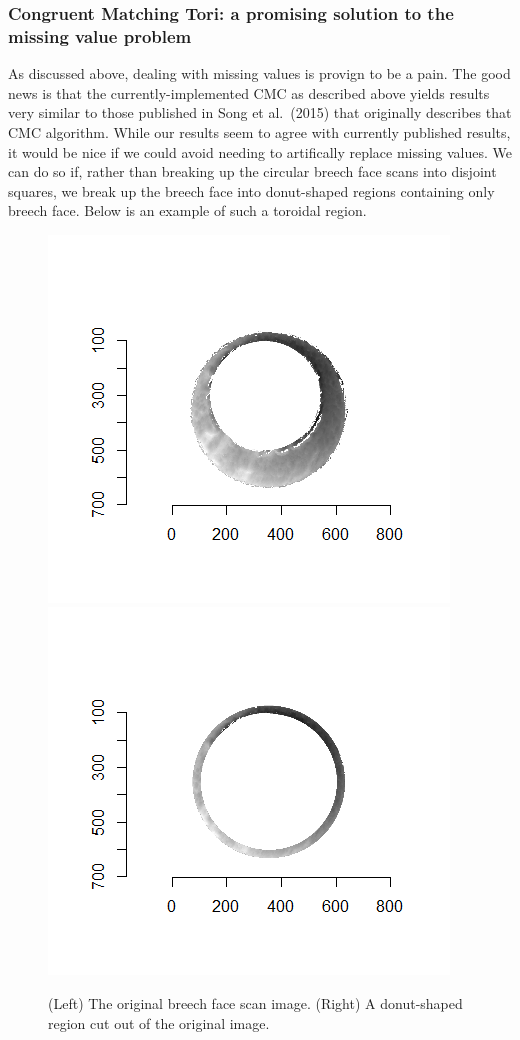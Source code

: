 \documentclass[]{book}
\begin{document}
\hypertarget{congruent-matching-tori-a-promising-solution-to-the-missing-value-problem}{%
\subsubsection{Congruent Matching Tori: a promising solution to the missing value problem}\label{congruent-matching-tori-a-promising-solution-to-the-missing-value-problem}}

As discussed above, dealing with missing values is provign to be a pain. The good news is that the currently-implemented CMC as described above yields results very similar to those published in Song et al.~(2015) that originally describes that CMC algorithm. While our results seem to agree with currently published results, it would be nice if we could avoid needing to artifically replace missing values. We can do so if, rather than breaking up the circular breech face scans into disjoint squares, we break up the breech face into donut-shaped regions containing only breech face. Below is an example of such a toroidal region.

\begin{figure}

{\centering \includegraphics[width=0.5\linewidth]{images/joeZ/im1_original} \includegraphics[width=0.5\linewidth]{images/joeZ/im1_toroidalRegion} 

}

\caption{(Left) The original breech face scan image. (Right) A donut-shaped region cut out of the original image.}\label{fig:unnamed-chunk-12}
\end{figure}
\end{document}
